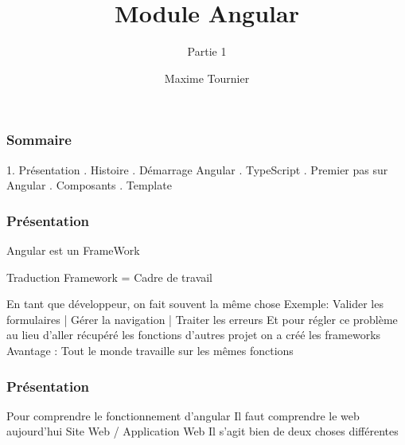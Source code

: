 \documentclass[10pt]{beamer}
\title[Angular]
{Module Angular}
\subtitle{Partie 1}
\author[Maxime Tournier]
{Maxime Tournier}
\date[21/08/2023]
\begin{document}
	\frame{\titlepage}

	\begin{frame}
		\frametitle{Sommaire}

		1. {Présentation} . {Histoire} . {Démarrage Angular} . {TypeScript} . {Premier pas sur Angular} . {Composants} . {Template} \newline

	\end{frame}


	\begin{frame}
		\frametitle{Présentation}
	
		Angular est un \alert{FrameWork}

		\begin{block}{Traduction}
			Framework = Cadre de travail
		\end{block}

		En tant que développeur, on fait souvent la même chose \newline \newline
		Exemple: \newline Valider les formulaires | Gérer la navigation | Traiter les erreurs
		\newline \newline
		Et pour régler ce problème au lieu d'aller récupéré les fonctions d'autres projet on a créé les frameworks
		\newline \newline
		Avantage : Tout le monde travaille sur les mêmes fonctions
		
	\end{frame}

	\begin{frame}
		\frametitle{Présentation}

		Pour comprendre le fonctionnement d'angular
		\newline \newline
		Il faut comprendre le web aujourd'hui
		\newline \newline
		Site Web / Application Web
		\newline \newline
		Il s'agit bien de deux choses différentes

	\end{frame}
\end{document}
